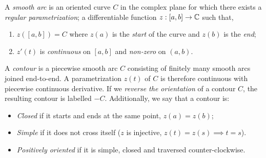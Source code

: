 \begin{defn}{}{}
A \emph{smooth arc} is an oriented curve $C$ in the complex plane for which there exists a \emph{regular parametrization}; a differentiable function $z:[a,b]\to\mathbb{C}$ such that,\vspace{-2pt}
\begin{enumerate}\itemsep2pt
  \item $z([a,b])=C$ where $z(a)$ is the \emph{start} of the curve and $z(b)$ is the \emph{end};
  \item $z'(t)$ is \emph{continuous} on $[a,b]$ and \emph{non-zero} on $(a,b)$.
\end{enumerate}%
A \emph{contour} is a piecewise smooth arc $C$ consisting of finitely many smooth arcs joined end-to-end. A parametrization $z(t)$ of $C$ is therefore continuous with piecewise continuous derivative.\smallbreak
If we \emph{reverse the orientation} of a contour $C$, the resulting contour is labelled $-C$.\smallbreak
Additionally, we say that a contour is:\vspace{-2pt}
\begin{itemize}\itemsep2pt
  \item \emph{Closed} if it starts and ends at the same point, $z(a)=z(b)$;
  \item \emph{Simple} if it does not cross itself ($z$ is injective, $z(t)=z(s)\implies t=s$).
  \item \emph{Positively oriented} if it is simple, closed and traversed counter-clockwise.
\end{itemize}
\end{defn}


